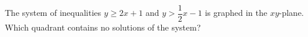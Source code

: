 The system of inequalities $y\ge2x+1$ and $y>\dfrac{1}{2}x-1$ is graphed in the $xy$-plane. Which quadrant contains no solutions of the system?
